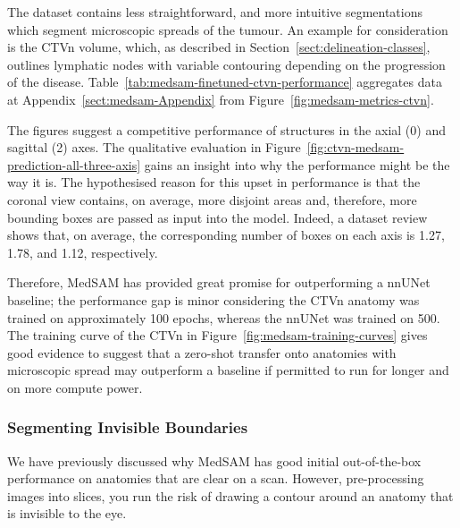 \documentclass[11pt,twoside]{report}
\begin{document}
\clearpage

The dataset contains less straightforward, and more intuitive segmentations which segment microscopic spreads of the tumour. An example for consideration is the CTVn volume, which, as described in Section~\ref{sect:delineation-classes}, outlines lymphatic nodes with variable contouring depending on the progression of the disease. Table~\ref{tab:medsam-finetuned-ctvn-performance} aggregates data at Appendix~\ref{sect:medsam-Appendix} from Figure~\ref{fig:medsam-metrics-ctvn}.

The figures suggest a competitive performance of structures in the axial (0) and sagittal (2) axes. The qualitative evaluation in Figure~\ref{fig:ctvn-medsam-prediction-all-three-axis} gains an insight into why the performance might be the way it is. The hypothesised reason for this upset in performance is that the coronal view contains, on average, more disjoint areas and, therefore, more bounding boxes are passed as input into the model. Indeed, a dataset review shows that, on average, the corresponding number of boxes on each axis is 1.27, 1.78, and 1.12, respectively. 

Therefore, MedSAM has provided great promise for outperforming a nnUNet baseline; the performance gap is minor considering the CTVn anatomy was trained on approximately 100 epochs, whereas the nnUNet was trained on 500. The training curve of the CTVn in Figure~\ref{fig:medsam-training-curves} gives good evidence to suggest that a zero-shot transfer onto anatomies with microscopic spread may outperform a baseline if permitted to run for longer and on more compute power. 

\subsubsection{Segmenting Invisible Boundaries}

We have previously discussed why MedSAM has good initial out-of-the-box performance on anatomies that are clear on a scan. However, pre-processing images into slices, you run the risk of drawing a contour around an anatomy that is invisible to the eye.
\end{document}
